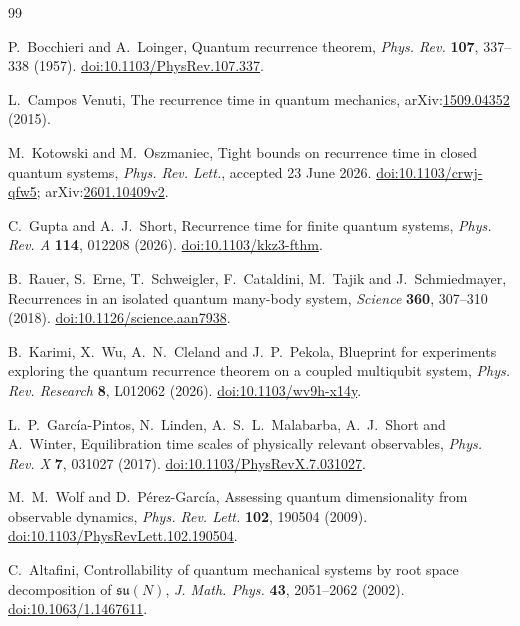 \documentclass[10pt]{article}
\theoremstyle{definition}
\begin{document}
\begin{thebibliography}{99}
\small
\raggedright

P.~Bocchieri and A.~Loinger,
Quantum recurrence theorem,
\emph{Phys. Rev.} \textbf{107}, 337--338 (1957).
\href{https://doi.org/10.1103/PhysRev.107.337}
{doi:10.1103/PhysRev.107.337}.

L.~Campos Venuti,
The recurrence time in quantum mechanics,
arXiv:\href{https://arxiv.org/abs/1509.04352}{1509.04352} (2015).

M.~Kotowski and M.~Oszmaniec,
Tight bounds on recurrence time in closed quantum systems,
\emph{Phys. Rev. Lett.}, accepted 23 June 2026.
\href{https://doi.org/10.1103/crwj-qfw5}{doi:10.1103/crwj-qfw5};
arXiv:\href{https://arxiv.org/abs/2601.10409}{2601.10409v2}.

C.~Gupta and A.~J.~Short,
Recurrence time for finite quantum systems,
\emph{Phys. Rev. A} \textbf{114}, 012208 (2026).
\href{https://doi.org/10.1103/kkz3-fthm}{doi:10.1103/kkz3-fthm}.

B.~Rauer, S.~Erne, T.~Schweigler, F.~Cataldini, M.~Tajik and
J.~Schmiedmayer,
Recurrences in an isolated quantum many-body system,
\emph{Science} \textbf{360}, 307--310 (2018).
\href{https://doi.org/10.1126/science.aan7938}
{doi:10.1126/science.aan7938}.

B.~Karimi, X.~Wu, A.~N.~Cleland and J.~P.~Pekola,
Blueprint for experiments exploring the quantum recurrence theorem on a
coupled multiqubit system,
\emph{Phys. Rev. Research} \textbf{8}, L012062 (2026).
\href{https://doi.org/10.1103/wv9h-x14y}
{doi:10.1103/wv9h-x14y}.

L.~P.~Garc\'ia-Pintos, N.~Linden, A.~S.~L.~Malabarba, A.~J.~Short and
A.~Winter,
Equilibration time scales of physically relevant observables,
\emph{Phys. Rev. X} \textbf{7}, 031027 (2017).
\href{https://doi.org/10.1103/PhysRevX.7.031027}
{doi:10.1103/PhysRevX.7.031027}.

M.~M.~Wolf and D.~P\'erez-Garc\'ia,
Assessing quantum dimensionality from observable dynamics,
\emph{Phys. Rev. Lett.} \textbf{102}, 190504 (2009).
\href{https://doi.org/10.1103/PhysRevLett.102.190504}
{doi:10.1103/PhysRevLett.102.190504}.

C.~Altafini,
Controllability of quantum mechanical systems by root space decomposition
of \(\mathfrak{su}(N)\),
\emph{J. Math. Phys.} \textbf{43}, 2051--2062 (2002).
\href{https://doi.org/10.1063/1.1467611}
{doi:10.1063/1.1467611}.


\end{thebibliography}
\end{document}
